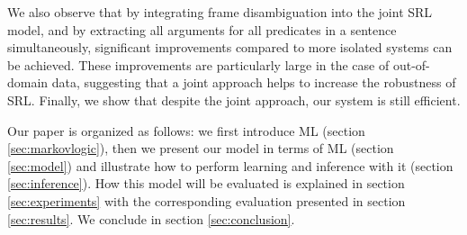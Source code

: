 
We also observe that by integrating frame disambiguation into the
joint SRL model, and by extracting all arguments for all predicates in a
sentence simultaneously, significant improvements compared to more isolated systems can be achieved. These improvements are particularly large in
the case of out-of-domain data, suggesting that a joint approach helps
to increase the robustness of SRL.
Finally, we show that despite the joint approach, our
system is still efficient. 

Our paper is organized as follows: we first introduce ML (section
\ref{sec:markovlogic}),
then we present our model in terms of ML (section \ref{sec:model}) and illustrate how to perform learning and inference with it (section \ref{sec:inference}). How this model
will be evaluated is explained in section \ref{sec:experiments} with the corresponding
evaluation presented in section \ref{sec:results}. We conclude in section
\ref{sec:conclusion}.


